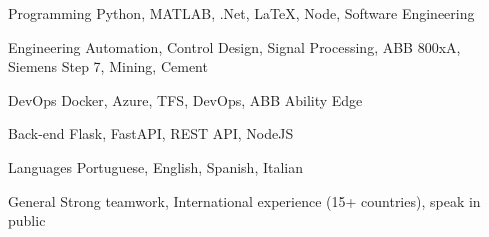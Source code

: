 

\begin{cvskills}

  \cvskill
    {Programming} %
    {Python, MATLAB, .Net, LaTeX, Node, Software Engineering} %

  \cvskill
    {Engineering} %
    {Automation, Control Design, Signal Processing, ABB 800xA, Siemens Step 7, Mining, Cement} %
  
  \cvskill
    {DevOps} %
    {Docker, Azure, TFS, DevOps, ABB Ability Edge} %

  \cvskill
    {Back-end} %
    {Flask, FastAPI, REST API, NodeJS} %

  \cvskill
    {Languages} %
    {Portuguese, English, Spanish, Italian} %

  \cvskill
    {General} %
    {Strong teamwork, International experience (15+ countries), speak in public} %

\end{cvskills}
